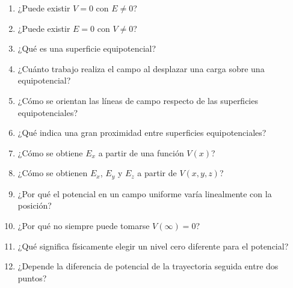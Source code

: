 \begin{enumerate}
    \item ¿Puede existir \(V=0\) con \(E\neq0\)?

    \item ¿Puede existir \(E=0\) con \(V\neq0\)?

    \item ¿Qué es una superficie equipotencial?

    \item ¿Cuánto trabajo realiza el campo al desplazar una carga sobre una
    equipotencial?

    \item ¿Cómo se orientan las líneas de campo respecto de las superficies
    equipotenciales?

    \item ¿Qué indica una gran proximidad entre superficies equipotenciales?

    \item ¿Cómo se obtiene \(E_x\) a partir de una función \(V(x)\)?

    \item ¿Cómo se obtienen \(E_x\), \(E_y\) y \(E_z\) a partir de \(V(x,y,z)\)?

    \item ¿Por qué el potencial en un campo uniforme varía linealmente con la posición?

    \item ¿Por qué no siempre puede tomarse \(V(\infty)=0\)?

    \item ¿Qué significa físicamente elegir un nivel cero diferente para el potencial?

    \item ¿Depende la diferencia de potencial de la trayectoria seguida entre dos
    puntos?
\end{enumerate}


